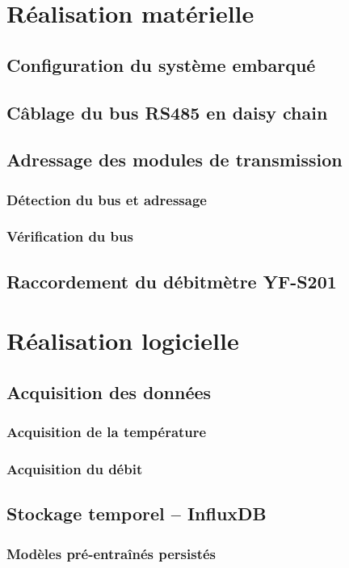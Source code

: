 \documentclass[12pt,a4paper]{report}
\begin{document}
\section{Réalisation matérielle}
\subsection{Configuration du système embarqué}
\subsection{Câblage du bus RS485 en daisy chain}
\subsection{Adressage des modules de transmission}
\subsubsection{Détection du bus et adressage}
\subsubsection{Vérification du bus}
\subsection{Raccordement du débitmètre YF-S201}
\section{Réalisation logicielle}
\subsection{Acquisition des données}
\subsubsection{Acquisition de la température}
\subsubsection{Acquisition du débit}
\subsection{Stockage temporel -- InfluxDB}
\subsubsection{Modèles pré-entraînés persistés}
\end{document}
